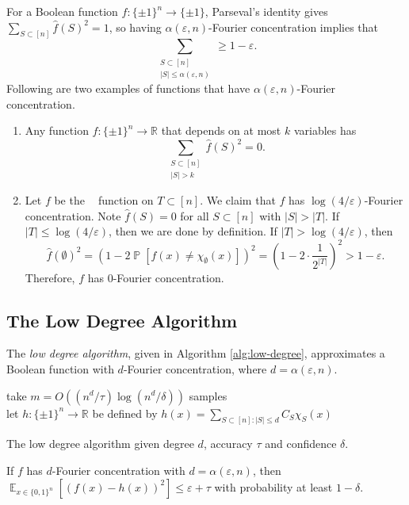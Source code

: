\documentclass[letterpaper, reqno,11pt]{article}
\newcommand{\RR}{\mathbb{R}}
\newcommand{\PP}{\mathop{{}\mathbb{P}}}
\newcommand{\EE}{\mathop{{}\mathbb{E}}}
\DeclareMathOperator{\ANDbar}{\mathsf{\overline{AND}}}
\DeclareMathOperator{\sign}{sign}
\begin{document}
For a Boolean function $f : \{ \pm 1 \}^n \to \{ \pm 1 \}$, Parseval's identity gives $\sum_{S \subset [n]} \hat{f}(S)^2 = 1$, so having $\alpha(\varepsilon, n)$-Fourier concentration implies that
$$ \sum_{\substack{S \subset [n] \\ |S| \leq \alpha(\varepsilon, n)}} \geq 1 - \varepsilon. $$
Following are two examples of functions that have $\alpha(\varepsilon, n)$-Fourier concentration.
\begin{enumerate}[label=(\roman*)]
  \item Any function $f : \{ \pm 1 \}^n \to \RR$ that depends on at most $k$ variables has
  $$ \sum_{\substack{S \subset [n] \\ |S| > k}} \hat{f}(S)^2 = 0. $$
  \item Let $f$ be the $\ANDbar$ function on $T \subset [n]$. We claim that $f$ has $\log(4/\varepsilon)$-Fourier concentration. Note $\hat{f}(S) = 0$ for all $S \subset [n]$ with $|S| > |T|$. If $|T| \leq \log(4/\varepsilon)$, then we are done by definition. If $|T| > \log (4/\varepsilon)$, then
  $$ \hat{f}(\emptyset)^2 = \left(1 - 2\PP\left[f(x) \neq \chi_\emptyset(x)\right]\right)^2 = \left(1 - 2 \cdot \frac{1}{2^{|T|}}\right)^2 > 1 - \varepsilon. $$
  Therefore, $f$ has $0$-Fourier concentration.
\end{enumerate}

\subsection{The Low Degree Algorithm}

The \emph{low degree algorithm}, given in Algorithm \ref{alg:low-degree}, approximates a Boolean function with $d$-Fourier concentration, where $d = \alpha(\varepsilon, n)$.

\begin{algorithm}
  take $m = O((n^d/\tau) \log (n^d/\delta))$ samples \\
  let $h : \{ \pm 1 \}^n \to \RR$ be defined by $h(x) = \sum_{S \subset [n] : |S| \leq d} C_S \chi_S(x)$ \\
  \Return{$\sign \circ h$ as hypothesis}
  \caption{The low degree algorithm given degree $d$, accuracy $\tau$ and confidence $\delta$.}
  \label{alg:low-degree}
\end{algorithm}

\begin{proposition}
  If $f$ has $d$-Fourier concentration with $d = \alpha(\varepsilon, n)$, then $\EE_{x \in \{ 0, 1 \}^n} [(f(x) - h(x))^2] \leq \varepsilon + \tau$ with probability at least $1 - \delta$.
\end{proposition}
\end{document}

